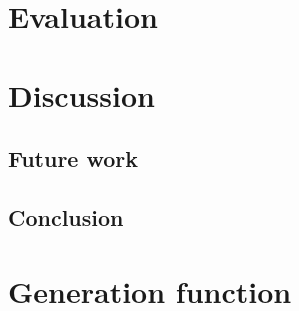 \documentclass{ituthesis}
\theoremstyle{break}
\begin{document}
\chapter{Evaluation}
\label{cha:Evaluation}

\chapter{Discussion}
\label{cha:Discussion}


\section{Future work}
\label{sec:FutureWork}

\section{Conclusion}
\label{sec:Conclusion}

\printbibliography
\appendix
\chapter{Generation function}
\label{cha:Generation function}

\end{document}
